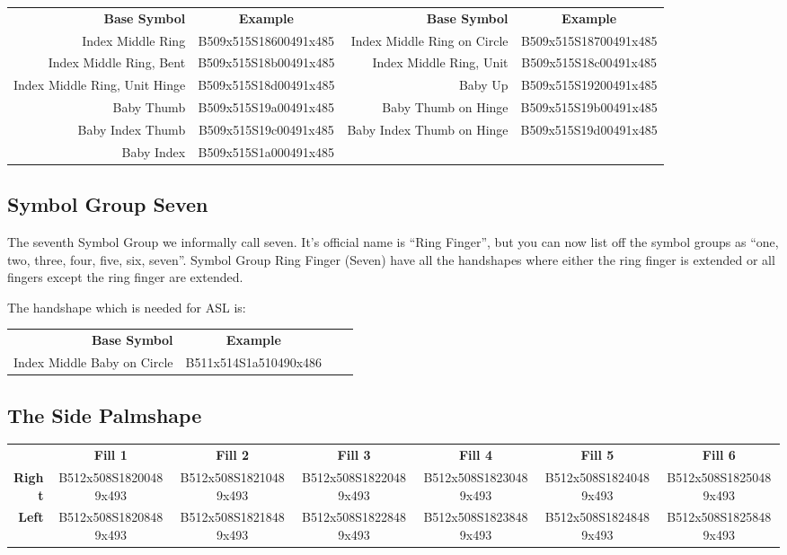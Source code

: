 \documentclass{article}
\begin{document}
\begin{center}
\begin{tabular}{rcrc}
\textbf{Base Symbol}&\textbf{Example}&\textbf{Base Symbol}&\textbf{Example}\\
Index Middle Ring            &B509x515S18600491x485&Index Middle Ring on Circle&B509x515S18700491x485\\
Index Middle Ring, Bent      &B509x515S18b00491x485&Index Middle Ring, Unit    &B509x515S18c00491x485\\
Index Middle Ring, Unit Hinge&B509x515S18d00491x485&Baby Up                    &B509x515S19200491x485\\
Baby Thumb                   &B509x515S19a00491x485&Baby Thumb on Hinge        &B509x515S19b00491x485\\
Baby Index Thumb             &B509x515S19c00491x485&Baby Index Thumb on Hinge  &B509x515S19d00491x485\\
Baby Index                   &B509x515S1a000491x485\\
\end{tabular}
\end{center}

\subsection{Symbol Group Seven}

The seventh Symbol Group we informally call seven.
It's official name is ``Ring Finger'', but you can now list off the symbol groups as ``one, two, three, four, five, six, seven''.
Symbol Group Ring Finger (Seven) have all the handshapes where either the ring finger is extended or all fingers except the ring finger are extended.

The handshape which is needed for ASL is:

\begin{center}
\begin{tabular}{rcrc}
\textbf{Base Symbol}&\textbf{Example}\\
Index Middle Baby on Circle&B511x514S1a510490x486\\
\end{tabular}
\end{center}

\subsection{The Side Palmshape}

\begin{center}
\begin{tabular}{r*{6}{c}}
&\textbf{Fill 1}&\textbf{Fill 2}&\textbf{Fill 3}&\textbf{Fill 4}&\textbf{Fill 5}&\textbf{Fill 6}\\
\textbf{Right}&
B512x508S18200489x493&
B512x508S18210489x493&
B512x508S18220489x493&
B512x508S18230489x493&
B512x508S18240489x493&
B512x508S18250489x493\\
\textbf{Left}&
B512x508S18208489x493&
B512x508S18218489x493&
B512x508S18228489x493&
B512x508S18238489x493&
B512x508S18248489x493&
B512x508S18258489x493\\
\end{tabular}
\end{center}
\end{document}
